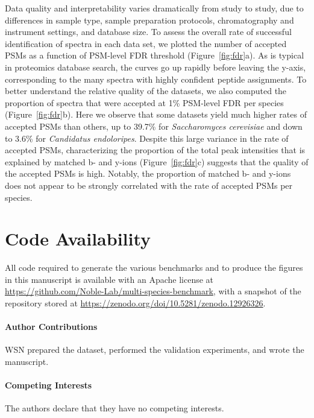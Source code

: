 \documentclass{article}
\begin{document}
Data quality and interpretability varies dramatically from study to study, due to differences in sample type, sample preparation protocols, chromatography and instrument settings, and database size.
To assess the overall rate of successful identification of spectra in each data set, we plotted the number of accepted PSMs as a function of PSM-level FDR threshold (Figure~\ref{fig:fdr}a).
As is typical in proteomics database search, the curves go up rapidly before leaving the y-axis, corresponding to the many spectra with highly confident peptide assignments.
To better understand the relative quality of the datasets, we also computed the proportion of spectra that were accepted at 1\% PSM-level FDR per species (Figure~\ref{fig:fdr}b).
Here we observe that some datasets yield much higher rates of accepted PSMs than others, up to 39.7\% for \textit{Saccharomyces cerevisiae} and down to 3.6\% for \textit{Candidatus endoloripes}.
Despite this large variance in the rate of accepted PSMs, characterizing the proportion of the total peak intensities that is explained by matched b- and y-ions (Figure~\ref{fig:fdr}c) suggests that the quality of the accepted PSMs is high.
Notably, the proportion of matched  b- and y-ions does not appear to be strongly correlated with the rate of accepted PSMs per species.

\section*{Code Availability}
All code required to generate the various benchmarks and to produce the figures in this manuscript is available with an Apache license at \url{https://github.com/Noble-Lab/multi-species-benchmark}, with a snapshot of the repository stored at \url{https://zenodo.org/doi/10.5281/zenodo.12926326}.



\paragraph{Author Contributions}
WSN prepared the dataset, performed the validation experiments, and wrote the manuscript.

\paragraph{Competing Interests}
The authors declare that they have no competing interests.
  
\end{document}
